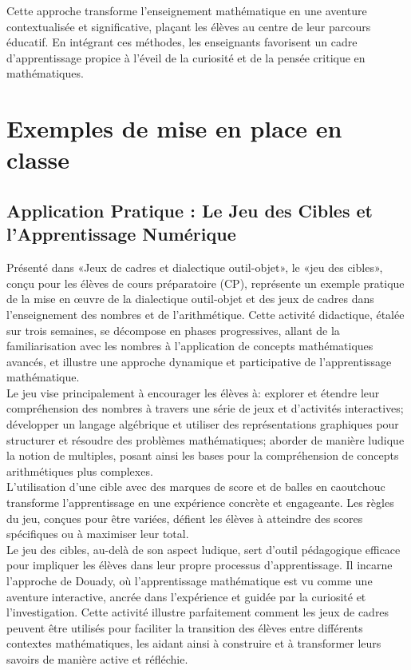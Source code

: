 Cette approche transforme l'enseignement mathématique en une aventure contextualisée et significative,
plaçant les élèves au centre de leur parcours éducatif.
En intégrant ces méthodes,
les enseignants favorisent un cadre d'apprentissage propice à l'éveil de la curiosité et de la pensée critique en mathématiques.

\section{Exemples de mise en place en classe}

\subsection{Application Pratique : Le Jeu des Cibles et l'Apprentissage Numérique}

Présenté dans «Jeux de cadres et dialectique outil-objet»,
le «jeu des cibles»,
conçu pour les élèves de cours préparatoire (CP),
représente un exemple pratique de la mise en œuvre de la dialectique outil-objet et des jeux de cadres dans l'enseignement des nombres et de l'arithmétique.
Cette activité didactique,
étalée sur trois semaines,
se décompose en phases progressives,
allant de la familiarisation avec les nombres à l'application de concepts mathématiques avancés,
et illustre une approche dynamique et participative de l'apprentissage mathématique.\\

Le jeu vise principalement à encourager les élèves à:
explorer et étendre leur compréhension des nombres à travers une série de jeux et d'activités interactives;
développer un langage algébrique et utiliser des représentations graphiques pour structurer et résoudre des problèmes mathématiques;
aborder de manière ludique la notion de multiples,
posant ainsi les bases pour la compréhension de concepts arithmétiques plus complexes.\\

L'utilisation d'une cible avec des marques de score et de balles en caoutchouc transforme l'apprentissage en une expérience concrète et engageante.
Les règles du jeu,
conçues pour être variées,
défient les élèves à atteindre des scores spécifiques ou à maximiser leur total.\\

Le jeu des cibles, au-delà de son aspect ludique,
sert d'outil pédagogique efficace pour impliquer les élèves dans leur propre processus d'apprentissage.
Il incarne l'approche de Douady,
où l'apprentissage mathématique est vu comme une aventure interactive,
ancrée dans l'expérience et guidée par la curiosité et l'investigation.
Cette activité illustre parfaitement comment les jeux de cadres peuvent être utilisés pour faciliter la transition des élèves entre différents contextes mathématiques,
les aidant ainsi à construire et à transformer leurs savoirs de manière active et réfléchie.\\

